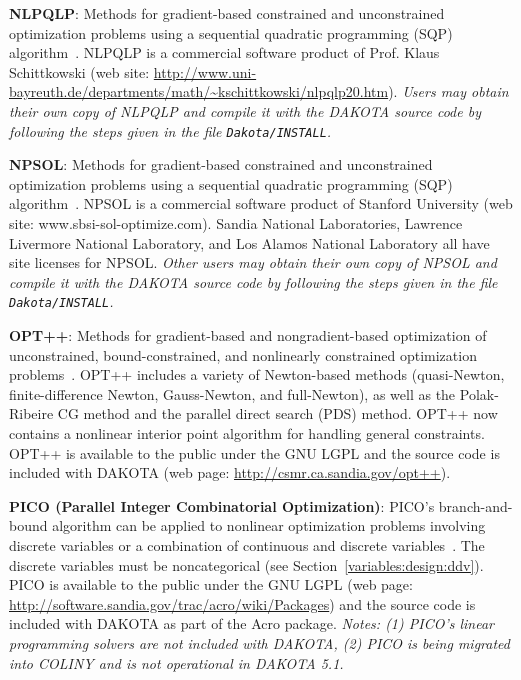 \textbf{NLPQLP}: Methods for gradient-based constrained and
unconstrained optimization problems using a sequential quadratic
programming (SQP) algorithm~\cite{Sch04}.  NLPQLP is a commercial
software product of Prof. Klaus Schittkowski (web site:
\url{http://www.uni-bayreuth.de/departments/math/~kschittkowski/nlpqlp20.htm}).
\emph{Users may obtain their own copy of NLPQLP and compile it with the
DAKOTA source code by following the steps given in the file {\tt Dakota/INSTALL}.}

\textbf{NPSOL}: Methods for gradient-based constrained and
unconstrained optimization problems using a sequential quadratic
programming (SQP) algorithm~\cite{Gil86}. NPSOL is a commercial software
product of Stanford University (web site: www.sbsi-sol-optimize.com).
Sandia National Laboratories, Lawrence Livermore National Laboratory,
and Los Alamos National Laboratory all have site licenses for NPSOL.
\emph{Other users may obtain their own copy of NPSOL and compile it
with the DAKOTA source code by following the steps given in the file
{\tt Dakota/INSTALL}.}

\textbf{OPT++}: Methods for gradient-based and nongradient-based
optimization of unconstrained, bound-constrained, and nonlinearly
constrained optimization problems~\cite{MeOlHoWi07}. OPT++ includes a
variety of Newton-based methods (quasi-Newton, finite-difference
Newton, Gauss-Newton, and full-Newton), as well as the Polak-Ribeire
CG method and the parallel direct search (PDS) method. OPT++ now
contains a nonlinear interior point algorithm for handling general
constraints.  OPT++ is available to the public under the GNU LGPL and
the source code is included with DAKOTA (web page:
\url{http://csmr.ca.sandia.gov/opt++}).

\textbf{PICO (Parallel Integer Combinatorial Optimization)}: PICO's
branch-and-bound algorithm can be applied to nonlinear optimization
problems involving discrete variables or a combination of continuous
and discrete variables~\cite{Eck01}. The discrete variables must be
noncategorical (see Section~\ref{variables:design:ddv}).  PICO is
available to the public under the GNU LGPL (web page:
\url{http://software.sandia.gov/trac/acro/wiki/Packages}) and the source code is included
with DAKOTA as part of the Acro package.  \emph{Notes: (1) PICO's linear
programming solvers are not included with DAKOTA, (2) PICO is being
migrated into COLINY and is not operational in DAKOTA 5.1.}


